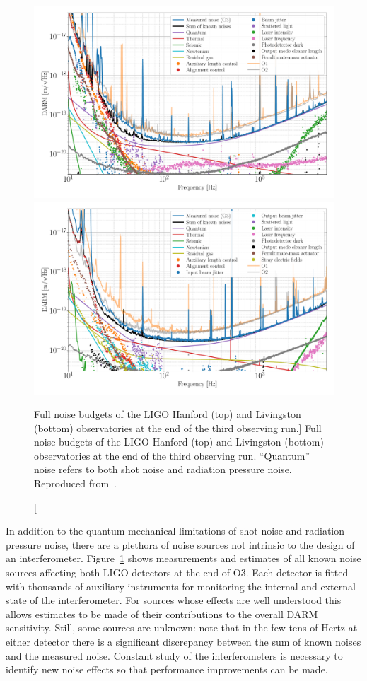 \begin{figure}
  \centering
  \includegraphics[width=\textwidth]{figures/detectors/budget-lho.pdf}
  \includegraphics[width=\textwidth]{figures/detectors/budget-llo.pdf}
  \caption
  [Full noise budgets of the LIGO Hanford (top) and Livingston (bottom) observatories at the end of the third observing run.]
  {Full noise budgets of the LIGO Hanford (top) and Livingston (bottom) observatories at the end of the third observing run. ``Quantum'' noise refers to both shot noise and radiation pressure noise. Reproduced from~\protect\citet{Buikema_2020}.}
  \label{fig:detectors-budget}
\end{figure}

In addition to the quantum mechanical limitations of shot noise and radiation pressure noise, there are a plethora of noise sources not intrinsic to the design of an interferometer.
Figure~\ref{fig:detectors-budget} shows measurements and estimates of all known noise sources affecting both LIGO detectors at the end of \ac{O3}.
Each detector is fitted with thousands of auxiliary instruments for monitoring the internal and external state of the interferometer.
For sources whose effects are well understood this allows estimates to be made of their contributions to the overall \ac{DARM} sensitivity.
Still, some sources are unknown: note that in the few tens of Hertz at either detector there is a significant discrepancy between the sum of known noises and the measured noise.
Constant study of the interferometers is necessary to identify new noise effects so that performance improvements can be made.


